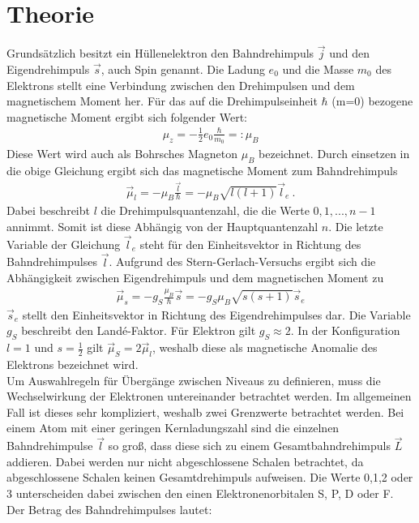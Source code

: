 \section{Theorie}
\label{sec:Theorie}

Grundsätzlich besitzt ein Hüllenelektron den Bahndrehimpuls $\vec{j}$ und den Eigendrehimpuls $\vec{s}$, auch Spin genannt. Die Ladung $e_0$ und die Masse $m_0$ des Elektrons stellt eine Verbindung zwischen den Drehimpulsen und dem magnetischem Moment her. Für das auf die Drehimpulseinheit $\hbar$ (m=0) bezogene magnetische Moment ergibt sich folgender Wert:
\begin{align}
	\mu_z=-\frac{1}{2}e_0\frac{\hbar}{m_0} =: \mu_B
\end{align}
Diese Wert wird auch als Bohrsches Magneton $\mu_B$ bezeichnet. Durch einsetzen in die obige Gleichung ergibt sich das magnetische Moment zum Bahndrehimpuls
\begin{align}
	\vec{\mu}_l=-\mu_B\frac{\vec{l}}{\hbar}=-\mu_B \sqrt{l(l+1)} \vec{l}_e\:.
\end{align}
Dabei beschreibt $l$ die Drehimpulsquantenzahl, die die Werte $0,1,...,n-1$ annimmt. Somit ist diese Abhängig von der Hauptquantenzahl $n$. Die letzte Variable der Gleichung $\vec{l}_e$ steht für den Einheitsvektor in Richtung des Bahndrehimpulses $\vec{l}$. Aufgrund des Stern-Gerlach-Versuchs ergibt sich die Abhängigkeit zwischen Eigendrehimpuls und dem magnetischen Moment zu
\begin{align}
	\vec{\mu}_s=-g_S\frac{\mu_B}{\hbar}\vec{s}=-g_S \mu_B \sqrt{s(s+1)} \vec{s}_e
\end{align}
$\vec{s}_e$ stellt den Einheitsvektor in Richtung des Eigendrehimpulses dar. Die Variable $g_S$ beschreibt den Land\'{e}-Faktor. Für Elektron gilt $g_S\approx 2$. In der Konfiguration $l=1$ und $s=\frac{1}{2}$ gilt $\vec{\mu}_S=2\vec{\mu}_l$, weshalb diese als magnetische Anomalie des Elektrons bezeichnet wird.
\\
Um Auswahlregeln für Übergänge zwischen Niveaus zu definieren, muss die Wechselwirkung der Elektronen untereinander betrachtet werden. Im allgemeinen Fall ist dieses sehr kompliziert, weshalb zwei Grenzwerte betrachtet werden. Bei einem Atom mit einer geringen Kernladungszahl sind die einzelnen Bahndrehimpulse $\vec{l}$ so groß, dass diese sich zu einem Gesamtbahndrehimpuls $\vec{L}$ addieren. Dabei werden nur nicht abgeschlossene Schalen betrachtet, da abgeschlossene Schalen keinen Gesamtdrehimpuls aufweisen. Die Werte 0,1,2 oder 3 unterscheiden dabei zwischen den einen Elektronenorbitalen S, P, D oder F. Der Betrag des Bahndrehimpulses lautet:
